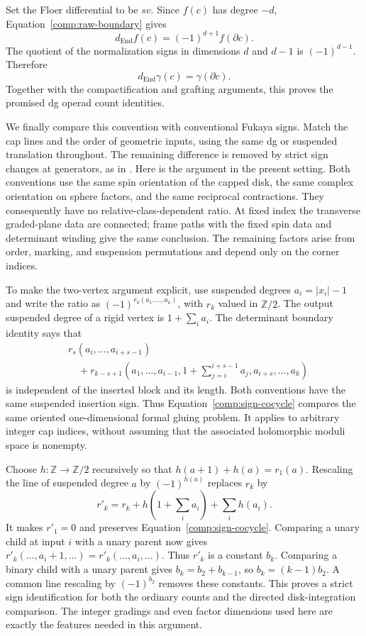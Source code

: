 \documentclass[11pt]{article}
\numberwithin{equation}{section}
\theoremstyle{definition}
\theoremstyle{remark}
\begin{document}
Set the Floer differential to be $s v$.  Since $f(c)$ has degree
$-d$, Equation~\eqref{comp:raw-boundary} gives
\[
 d_{\mathrm{End}}f(c)=(-1)^{d+1}f(\partial c).
\]
The quotient of the normalization signs in dimensions $d$ and
$d-1$ is $(-1)^{d-1}$.  Therefore
\begin{equation}
 d_{\mathrm{End}}\gamma(c)=\gamma(\partial c).
 \label{comp:dg-count}
\end{equation}
Together with the compactification and grafting arguments, this
proves the promised dg operad count identities.

We finally compare this convention with conventional Fukaya
signs.  Match the cap lines and the order of geometric inputs,
using the same dg or suspended translation throughout.  The
remaining difference is removed by strict sign changes at
generators, as in \cite[Lemma~7.7]{A8}.  Here is the argument in the
present setting.  Both conventions use the same spin orientation
of the capped disk, the same complex orientation on sphere
factors, and the same reciprocal contractions.  They consequently
have no relative-class-dependent ratio.  At fixed index the
transverse graded-plane data are connected; frame paths with the
fixed spin data and determinant winding give the same conclusion.
The remaining factors arise from order, marking, and suspension
permutations and depend only on the corner indices.

To make the two-vertex argument explicit, use suspended degrees
$a_i=|x_i|-1$ and write the ratio as
$(-1)^{r_k(a_1,\ldots,a_k)}$, with $r_k$ valued in $\mathbb Z/2$.
The output suspended degree of a rigid vertex is
$1+\sum_i a_i$.  The determinant boundary identity says that
\begin{equation}
 \begin{split}
 &r_s(a_i,\ldots,a_{i+s-1})\\
 &\quad+r_{k-s+1}\left(a_1,\ldots,a_{i-1},
     1+\sum_{j=i}^{i+s-1}a_j,a_{i+s},\ldots,a_k\right)
 \end{split}
 \label{comp:sign-cocycle}
\end{equation}
is independent of the inserted block and its length.  Both
conventions have the same suspended insertion sign.  Thus
Equation~\eqref{comp:sign-cocycle} compares the same oriented
one-dimensional formal gluing problem.  It applies to arbitrary
integer cap indices, without assuming that the associated
holomorphic moduli space is nonempty.

Choose $h:\mathbb Z\to\mathbb Z/2$ recursively so that
$h(a+1)+h(a)=r_1(a)$.  Rescaling the line of suspended degree $a$
by $(-1)^{h(a)}$ replaces $r_k$ by
\[
 r'_k=r_k+h\left(1+\sum_i a_i\right)+\sum_i h(a_i).
\]
It makes $r'_1=0$ and preserves
Equation~\eqref{comp:sign-cocycle}.  Comparing a unary child at
input $i$ with a unary parent now gives
$r'_k(\ldots,a_i+1,\ldots)=r'_k(\ldots,a_i,\ldots)$.
Thus $r'_k$ is a constant $b_k$.  Comparing a binary child with a
unary parent gives $b_k=b_2+b_{k-1}$, so $b_k=(k-1)b_2$.
A common line rescaling by $(-1)^{b_2}$ removes these constants.
This proves a strict sign identification for both the ordinary
counts and the directed disk-integration comparison.  The
integer gradings and even factor dimensions used here are exactly
the features needed in this argument.
\end{document}
